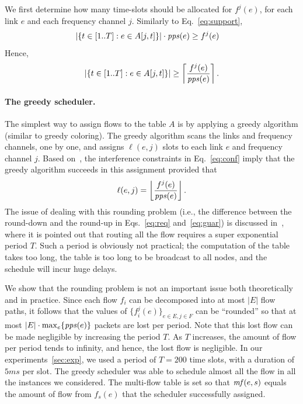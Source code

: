 \documentclass[12pt,oneside,english,a4paper]{book}
\theoremstyle{plain}
\theoremstyle{definition}
\theoremstyle{Theorem}
\theoremstyle{plain}
\newenvironment{proof sketch}[1]{\noindent {\emph{Proof sketch of #1:}}}{\hfill \qed}
\newcommand{\pps}{\text{\emph{pps}}}
\newcommand{\mf}{\text{\emph{mf}}}
\begin{document}
We first determine how many time-slots should be allocated for
$f^j(e)$, for each link $e$ and each frequency channel $j$.  Similarly to Eq.~\ref{eq:support},
\begin{align*}
  |\{ t\in[1..T] :e\in A[j,t]\}| \cdot \pps(e) &\geq f^j(e)
\end{align*}
Hence,
\begin{align}\label{eq:req}
  |\{ t\in[1..T] :e\in A[j,t]\}| \geq \left\lceil \frac{f^j(e)}{\pps(e)} \right\rceil.
  \end{align}
\paragraph{The greedy scheduler.}
  The simplest way to assign flows to the table $A$ is by applying a
  greedy algorithm (similar to greedy coloring).  The greedy algorithm scans the links and
  frequency channels, one by one, and assigns $\ell(e,j)$ slots to
  each link $e$ and frequency channel $j$.  Based
  on~\cite{alicherry2005joint11,kumar2004end,buragohain2007improved},
  the interference constraints in Eq.~\ref{eq:conf} imply that the
  greedy algorithm succeeds in this assignment provided that
\begin{align}\label{eq:guar}
 \ell(e,j) = \left\lfloor \frac{f^j(e)}{\pps(e)} \right\rfloor.
  \end{align}
  The issue of dealing with this rounding problem (i.e., the
  difference between the round-down and the round-up in Eqs.~\ref{eq:req} and~\ref{eq:guar}) is discussed
  in~\cite{wan2009multiflows}, where it is pointed out that routing
  all the flow requires a super exponential period $T$. Such a period
  is obviously not practical; the computation of the table takes too
  long, the table is too long to be broadcast to all nodes, and
  the schedule will incur huge delays.

  We show that the rounding problem is not an important issue both
  theoretically and in practice.  Since each flow $f_i$ can be
  decomposed into at most $|E|$ flow paths, it follows that the values
  of $\{f^j_i(e)\}_{e\in E, j\in F}$ can be ``rounded'' so that at
  most $|E|\cdot \max_e \{\pps(e)\}$ packets are lost per period.
  Note that this lost flow can be made negligible by increasing the
  period $T$.  As $T$ increases, the amount of flow per period tends
  to infinity, and hence, the lost flow is negligible. In our
  experiments~\ref{sec:exp}, we used a period of $T=200$ time slots,
  with a duration of $5ms$ per slot. The greedy scheduler was able to
  schedule almost all the flow in all the instances we considered.
  The multi-flow table is set so that $\mf(e,s)$ equals the amount of
  flow from $f_s(e)$ that the scheduler successfully assigned.
\end{document}
